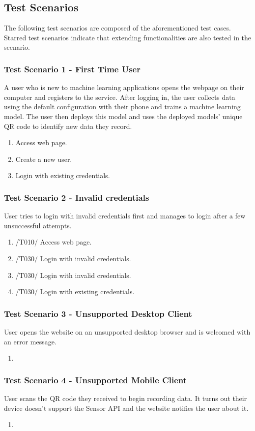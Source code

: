 \subsection{Test Scenarios}
The following test scenarios are composed of the aforementioned test cases. Starred test scenarios indicate that extending functionalities are also tested in the scenario.
\subsubsection{Test Scenario 1 - First Time User}
A user who is new to machine learning applications opens the webpage on their computer and registers to the service. After logging in, the user collects data using the default configuration with their phone and trains a machine learning model. The user then deploys this model and uses the deployed models' unique QR code to identify new data they record. 
\newpage
\begin{enumerate}
    \item Access web page.
    \item Create a new user.
    \item Login with existing credentials.

\end{enumerate}
\subsubsection{Test Scenario 2 - Invalid credentials}
User tries to login with invalid credentials first and manages to login after a few unsuccessful attempts.
\begin{enumerate}
    \item /T010/ Access web page.
    \item /T030/ Login with invalid credentials.
    \item /T030/ Login with invalid credentials.
    \item /T030/ Login with existing credentials.
\end{enumerate}
\subsubsection{Test Scenario 3 - Unsupported Desktop Client}
User opens the website on an unsupported desktop browser and is welcomed with an error message.
\begin{enumerate}
    \item 
\end{enumerate} 
\subsubsection{Test Scenario 4 - Unsupported Mobile Client}
User scans the QR code they received to begin recording data. It turns out their device doesn't support the Sensor API and the website notifies the user about it.
\begin{enumerate}
    \item 
\end{enumerate}
